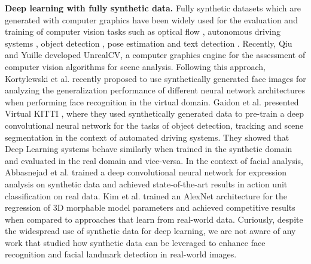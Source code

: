 \documentclass[10pt,twocolumn,letterpaper]{article}
\begin{document}
    \textbf{Deep learning with fully synthetic data.} 
    Fully synthetic datasets which are generated with computer graphics have been widely used for the evaluation and training of computer vision tasks such as optical flow \cite{butler2012naturalistic}, autonomous driving systems \cite{chen2015deepdriving}, object detection \cite{gupta2014learning}, pose estimation \cite{shotton2011real,park2015articulated,ionescu2014human3} and text detection \cite{gupta2016synthetic}. Recently, Qiu and Yuille \cite{qiu2017unrealcv} developed UnrealCV, a computer graphics engine for the assessment of computer vision algorithms for scene analysis. Following this approach, Kortylewski et al. \cite{kortylewski2017empirically} recently proposed to use synthetically generated face images for analyzing the generalization performance of different neural network architectures when performing face recognition in the virtual domain. Gaidon et al. presented Virtual KITTI \cite{gaidon2016virtual}, where they used synthetically generated data to pre-train a deep convolutional neural network for the tasks of object detection, tracking and scene segmentation in the context of automated driving systems. They showed that Deep Learning systems behave similarly when trained in the synthetic domain and evaluated in the real domain and vice-versa. In the context of facial analysis, Abbasnejad et al. \cite{abbasnejad2017using} trained a deep convolutional neural network for expression analysis on synthetic data and achieved state-of-the-art results in action unit classification on real data. Kim et al. \cite{kim2017inversefacenet} trained an AlexNet architecture for the regression of 3D morphable model parameters and achieved competitive results when compared to approaches that learn from real-world data. Curiously, despite the widespread use of synthetic data for deep learning, we are not aware of any work that studied how synthetic data can be leveraged to enhance face recognition and facial landmark detection in real-world images.
\end{document}
